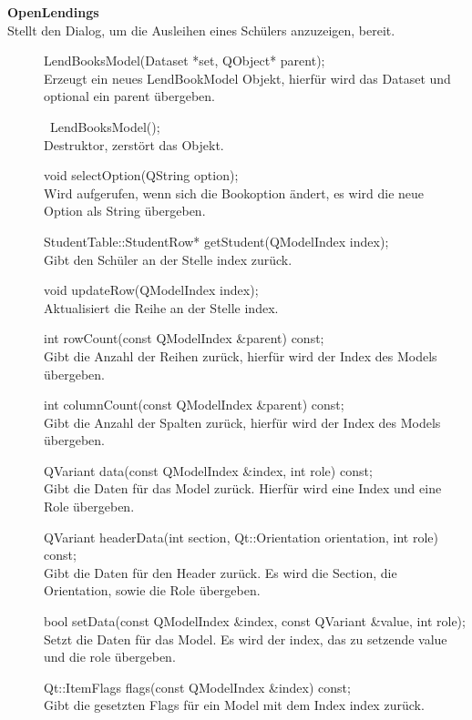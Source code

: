 \textbf{OpenLendings}\\
Stellt den Dialog, um die Ausleihen eines Schülers anzuzeigen, bereit.
\begin{description}
	\item[ ] LendBooksModel(Dataset *set, QObject* parent); \\
	Erzeugt ein neues LendBookModel Objekt, hierfür wird das Dataset und optional ein parent übergeben.
    \item[ ] ~LendBooksModel(); \\
    Destruktor, zerstört das Objekt.
    \item[ ] void selectOption(QString option); \\
    Wird aufgerufen, wenn sich die Bookoption ändert, es wird die neue Option als String übergeben.
    \item[ ] StudentTable::StudentRow* getStudent(QModelIndex index); \\
    Gibt den Schüler an der Stelle index zurück.
    \item[ ] void updateRow(QModelIndex index); \\
    Aktualisiert die Reihe an der Stelle index.
    \item[ ] int rowCount(const QModelIndex \&parent) const; \\
    Gibt die Anzahl der Reihen zurück, hierfür wird der Index des Models übergeben.
    \item[ ] int columnCount(const QModelIndex \&parent) const; \\
    Gibt die Anzahl der Spalten zurück, hierfür wird der Index des Models übergeben.
    \item[ ] QVariant data(const QModelIndex \&index, int role) const; \\
    Gibt die Daten für das Model zurück. Hierfür wird eine Index und eine Role übergeben.
    \item[ ] QVariant headerData(int section, Qt::Orientation orientation, int role) const; \\
    Gibt die Daten für den Header zurück. Es wird die Section, die Orientation, sowie die Role übergeben.
    \item[ ] bool setData(const QModelIndex \&index, const QVariant \&value, int role); \\
    Setzt die Daten für das Model. Es wird der index, das zu setzende value und die role übergeben.
    \item[ ] Qt::ItemFlags flags(const QModelIndex \&index) const; \\
	Gibt die gesetzten Flags für ein Model mit dem Index index zurück.
\end{description}


